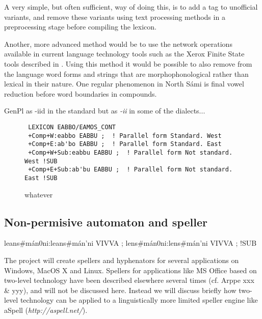 \documentclass[a4paper,english]{article}
\begin{document}

A very simple, but often sufficient, way of doing this, is to add a tag to unofficial variants, and remove these variants using text processing methods in a preprocessing stage before compiling the lexicon.


Another, more advanced method would be to use the network operations available in current language technology tools such as the Xerox Finite State tools described in \cite{Beesley03}. Using this method it would be possible to also remove from the language word forms and strings that are morphophonological rather than lexical in their nature. One regular phenomenon in North Sámi is final vowel reduction before word boundaries in compounds.


GenPl as -iid in the standard but as \textit{-ii}
 in some of the dialects...

\begin{figure}[htbp]
\caption{whatever}
\begin{center}
\begin{verbatim}
 LEXICON EABBO/EAMOS_CONT
 +Comp+W:eabbo EABBU ;  ! Parallel form Standard. West
 +Comp+E:ab'bo EABBU ;  ! Parallel form Standard. East
 +Comp+W+Sub:eabbu EABBU ;  ! Parallel form Not standard. West !SUB
 +Comp+E+Sub:ab'bu EABBU ;  ! Parallel form Not standard. East !SUB
\end{verbatim}
\label{EWadjcomp}
\end{center}
\end{figure}

\subsection{Non-permisive automaton and speller}


leans#mán0ni:leans#mán'ni VIVVA ;
lens#mán0ni:lens#mán'ni VIVVA ; !SUB

The project will create spellers and hyphenators for several applications on Windows, MacOS X and Linux. Spellers for applications like MS Office based on two-level technology have been described elsewhere several times (cf. Arppe xxx \& yyy), and will not be discussed here. Instead we will discuss briefly how two-level technology can be applied to a linguistically more limited speller engine like aSpell (\textit{http://aspell.net/}).
\end{document}
